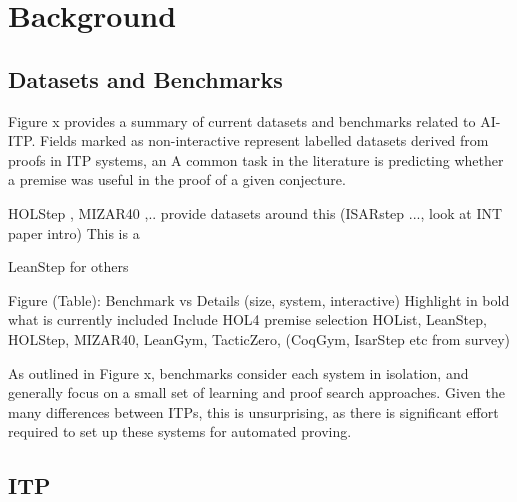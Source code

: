 \documentclass[letterpaper]{article} %
\begin{document}
    \section{Background}

    \subsection{Datasets and Benchmarks}

    Figure x provides a summary of current datasets and benchmarks related to AI-ITP.
    Fields marked as non-interactive represent labelled datasets derived from proofs in ITP systems, an
    A common task in the literature is predicting whether a premise was useful in the proof of a given conjecture.

    HOLStep \cite{kaliszyk_holstep_2017}, MIZAR40 \cite{kaliszyk_mizar_2015},.. provide datasets around this (ISARstep ..., look at INT paper intro)
    This is a


    LeanStep for others

    Figure (Table):
    Benchmark vs Details (size, system, interactive)
    Highlight in bold what is currently included
    Include HOL4 premise selection
    HOList, LeanStep, HOLStep, MIZAR40, LeanGym, TacticZero, (CoqGym, IsarStep etc from survey)

    As outlined in Figure x, benchmarks consider each system in isolation, and generally focus on a small set of
    learning and proof search approaches.
    Given the many differences between ITPs, this is unsurprising, as there is significant effort required to set
    up these systems for automated proving.

%
%

    \subsection{ITP}
\end{document}
